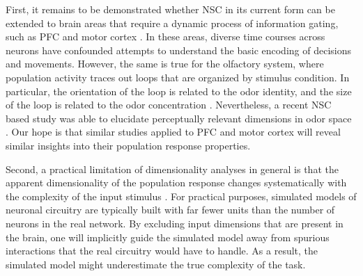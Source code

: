 First, it remains to be demonstrated whether \ac{NSC} in its current form
can be extended to brain areas that require a dynamic process of information
gating, such as \ac{PFC} \cite{Mante2013,Rigotti2013,Kobak2016}
and motor cortex \cite{Vargas2010decoding,GrazianoAflalo2007}.
In these areas, diverse time courses across neurons have confounded
attempts to understand the basic encoding of decisions and movements.
However, the same is true for the olfactory system,
where population activity traces out loops that are organized by stimulus
condition. In particular, the orientation of the loop 
is related to the odor identity,
and the size of the loop is related to the odor concentration
\cite{Broome2006}.
Nevertheless, a recent \ac{NSC} based study was able to elucidate perceptually
relevant dimensions in odor space \cite{Castro2013}.
Our hope is that similar studies applied to \ac{PFC} and motor cortex will
reveal similar insights into their population response properties.

Second, a practical limitation of dimensionality analyses in general
is that the apparent dimensionality of the population response changes
systematically with the complexity of the input stimulus
\cite{SpanneJorntell2015,Cowley2016,Mazzucato2016}.
For practical purposes, simulated models of neuronal circuitry are typically
built with far fewer units than the number of neurons in the real network.
By excluding input dimensions that are present in the brain,
one will implicitly guide the simulated model away from spurious interactions
that the real circuitry would have to handle.
As a result, the simulated model might underestimate 
the true complexity of the task.

